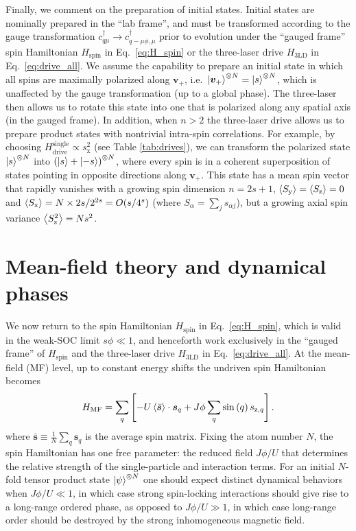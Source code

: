 \documentclass[nofootinbib,twocolumn]{revtex4-2}
\renewcommand{\t}{\text} %
\newcommand{\p}[1]{\left(#1\right)} %
\renewcommand{\sp}[1]{\left[#1\right]} %
\newcommand{\bk}{\Braket} %
\renewcommand{\v}{\bm} %
\renewcommand{\c}{\cdot} %
\newcommand{\1}{\mathds{1}}
\newcommand{\x}{\text{x}}
\newcommand{\y}{\text{y}}
\newcommand{\z}{\text{z}}
\newcommand{\MF}{\text{MF}}
\begin{document}
Finally, we comment on the preparation of initial states.
Initial states are nominally prepared in the ``lab frame'', and must be transformed according to the gauge transformation $c_{q\mu}^\dag\to c_{q-\mu\phi,\mu}^\dag$ prior to evolution under the ``gauged frame'' spin Hamiltonian $H_{\t{spin}}$ in Eq.~\eqref{eq:H_spin} or the three-laser drive $H_{\t{3LD}}$ in Eq.~\eqref{eq:drive_all}.
We assume the capability to prepare an initial state in which all spins are maximally polarized along $\v v_+$, i.e.~$\ket{\v v_+}^{\otimes N}=\ket{s}^{\otimes N}$, which is unaffected by the gauge transformation (up to a global phase).
The three-laser then allows us to rotate this state into one that is polarized along any spatial axis (in the gauged frame).
In addition, when $n>2$ the three-laser drive allows us to prepare product states with nontrivial intra-spin correlations.
For example, by choosing $H_{\t{drive}}^{\t{single}}\propto s_\x^2$ (see Table \ref{tab:drives}), we can transform the polarized state $\ket{s}^{\otimes N}$ into $\p{\ket{s}+\ket{-s}}^{\otimes N}$, where every spin is in a coherent superposition of states pointing in opposite directions along $\v v_+$.
This state has a mean spin vector that rapidly vanishes with a growing spin dimension $n=2s+1$, $\bk{S_\y}=\bk{S_\z}=0$ and $\bk{S_\x}=N\times 2s/2^{2s}=O(s/4^s)$ (where $S_\alpha = \sum_j s_{\alpha j}$), but a growing axial spin variance $\bk{S_\z^2}=Ns^2$.

\section{Mean-field theory and dynamical phases}
\label{sec:mean_field}

We now return to the spin Hamiltonian $H_{\t{spin}}$ in Eq.~\eqref{eq:H_spin}, which is valid in the weak-SOC limit $s\phi\ll1$, and henceforth work exclusively in the ``gauged frame'' of $H_{\t{spin}}$ and the three-laser drive $H_{\t{3LD}}$ in Eq.~\eqref{eq:drive_all}.
At the mean-field (MF) level, up to constant energy shifts the undriven spin Hamiltonian becomes
\begin{align}
  H_\MF = \sum_q\sp{-U\bk{\bar{\v s}}\c\v s_q
    + J\phi \sum_q \sin\p{q} s_{\z,q}}.
  \label{eq:H_MF}
\end{align}
where $\bar{\v s}\equiv\frac1N\sum_q\v s_q$ is the average spin matrix.
Fixing the atom number $N$, the spin Hamiltonian has one free parameter: the reduced field $J\phi/U$ that determines the relative strength of the single-particle and interaction terms.
For an initial $N$-fold tensor product state $\ket\psi^{\otimes N}$ one should expect distinct dynamical behaviors when $J\phi/U\ll1$, in which case strong spin-locking interactions should give rise to a long-range ordered phase, as opposed to $J\phi/U\gg1$, in which case long-range order should be destroyed by the strong inhomogeneous magnetic field.
\end{document}
